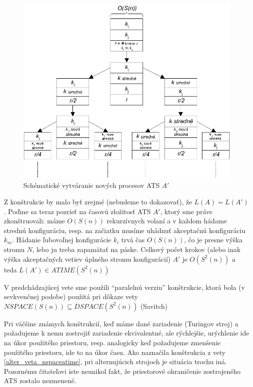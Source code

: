 \begin{dokaz}
  \begin{figure}[!ht]
    \centering
    \includegraphics{img/ats_time}
    \caption{Schématické vytváranie nových procesov ATS $A'$}
    \label{ats_time}
  \end{figure}

  Z konštrukcie by malo byť zrejmé (nebudeme to dokazovať), že
  $L(A)=L(A')$. Poďme sa teraz pozrieť na časovú zložitosť ATS $A'$,
  ktorý sme práve zkonštruovali: máme $O(S(n))$ rekurzívnych volaní
  a v každom hádame strednú konfiguráciu, resp. na začiatku musíme
  uhádnuť akceptačnú konfiguráciu $k_m$. Hádanie ľubovoľnej
  konfigurácie $k_i$ trvá čas $O(S(n))$, čo je presne výška stromu
  $N$, lebo ju treba zapamätať na páske. Celkový počet krokov (alebo
  inak výška akceptačných vetiev úplného stromu konfigurácií) $A'$
  je $O(S^2(n))$ a teda $L(A')\in ATIME(S^2(n))$
\end{dokaz}

\begin{poznamka}
  V predchádzajúcej vete sme použili ``paralelnú verziu''
  konštrukcie, ktorá bola (v sevkvenčnej podobe) použitá pri dôkaze
  vety $NSPACE(S(n))\subseteq DSPACE(S^2(n))$ (Savitch)
\end{poznamka}

Pri väčšine známych konštrukcií, keď máme dané zariadenie
(Turingov stroj) a požadujeme k nemu zostrojiť zariadenie
ekvivalentné, ale rýchlejšie, urýchlenie ide na úkor použitého
priestoru, resp. analogicky keď požadujeme zmenšenie použitého
priestoru, ide to na úkor času. Ako naznačila konštrukcia z vety
\ref{alter_veta_nspaceatime}, pri alternujúcich strojoch je situácia trochu
iná. Pozornému čitateľovi iste neunikol fakt, že priestorové
ohraničenie zostrojeného ATS zostalo nezmenené.

